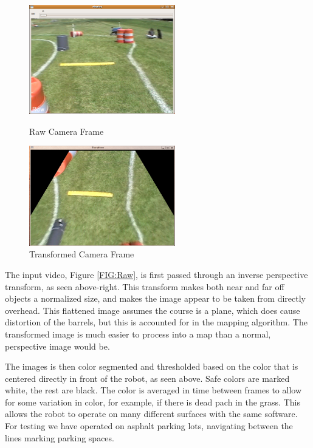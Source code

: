 \begin{figure}[H]
\begin{minipage}[b]{0.5\linewidth}
\centering
\includegraphics[width=2.5in]{./pics/raw.png}
\caption{Raw Camera Frame}
\label{FIG:Raw}
\end{minipage}
\hspace{0.1in}
\begin{minipage}[b]{0.5\linewidth}
\centering
\includegraphics[width=2.5in]{./pics/trans.png}
\caption{Transformed Camera Frame}
\label{FIG:Trans}
\end{minipage}
\end{figure}

The input video, Figure \ref{FIG:Raw}, is first passed through an inverse perspective transform, as seen above-right. This transform makes both near and far off objects a normalized size, and makes the image appear to be taken from directly overhead. This flattened image assumes the course is a plane, which does cause distortion of the barrels, but this is accounted for in the mapping algorithm. The transformed image is much easier to process into a map than a normal, perspective image would be.

The images is then color segmented and thresholded based on the color that is centered directly in front of the robot, as seen above. Safe colors are marked white, the rest are black. The color is averaged in time between frames to allow for some variation in color, for example, if there is dead pach in the grass. This allows the robot to operate on many different surfaces with the same software. For testing we have operated on asphalt parking lots, navigating between the lines marking parking spaces.

